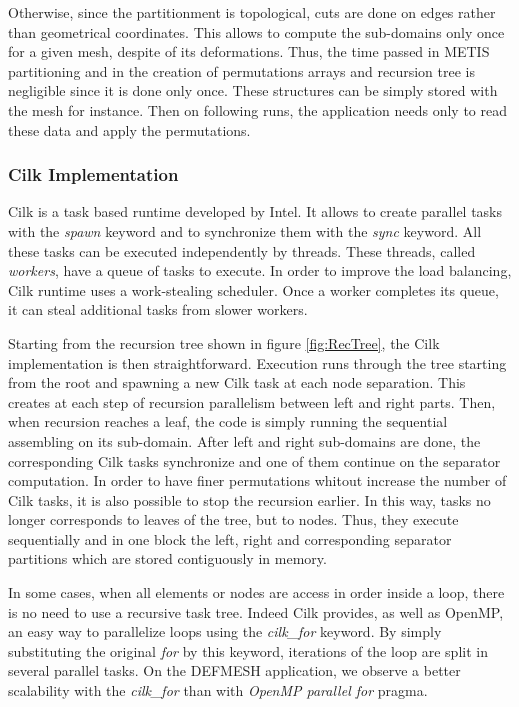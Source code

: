 \documentclass{IOS-Book-Article}
\begin{document}
Otherwise, since the partitionment is topological, cuts are done on edges rather than geometrical coordinates. This allows to compute the sub-domains only once
for a given mesh, despite of its deformations. Thus, the time passed in METIS partitioning and in the creation of permutations arrays and recursion tree is negligible since it is done only once.
These structures can be simply stored with the mesh for instance. Then on following runs, the application needs only to read these data and apply the permutations.

\subsubsection{Cilk Implementation}
Cilk is a task based runtime developed by Intel. It allows to create parallel tasks with the \emph{spawn} keyword and to synchronize them with the \emph{sync} keyword.
All these tasks can be executed independently by threads. These threads, called \emph{workers}, have a queue of tasks to execute.
In order to improve the load balancing, Cilk runtime uses a work-stealing scheduler. Once a worker completes its queue, it can steal additional tasks from slower workers.

Starting from the recursion tree shown in figure \ref{fig:RecTree}, the Cilk implementation is then straightforward.
Execution runs through the tree starting from the root and spawning a new Cilk task at each node separation.
This creates at each step of recursion parallelism between left and right parts.
Then, when recursion reaches a leaf, the code is simply running the sequential assembling on its sub-domain.
After left and right sub-domains are done, the corresponding Cilk tasks synchronize and one of them continue on the separator computation.
In order to have finer permutations whitout increase the number of Cilk tasks, it is also possible to stop the recursion earlier.
In this way, tasks no longer corresponds to leaves of the tree, but to nodes.
Thus, they execute sequentially and in one block the left, right and corresponding separator partitions which are stored contiguously in memory.

In some cases, when all elements or nodes are access in order inside a loop, there is no need to use a recursive task tree.
Indeed Cilk provides, as well as OpenMP, an easy way to parallelize loops using the \emph{cilk\_for} keyword.
By simply substituting the original \emph{for} by this keyword, iterations of the loop are split in several parallel tasks.
On the DEFMESH application, we observe a better scalability with the \emph{cilk\_for} than with \emph{OpenMP parallel for} pragma.
\end{document}
